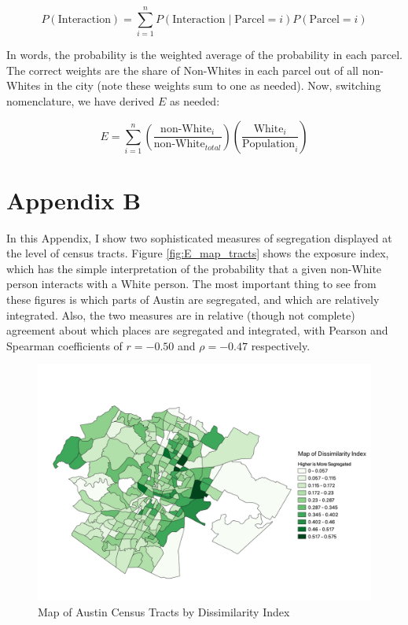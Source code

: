 \documentclass[11pt]{article}
\begin{document}
\begin{equation*}
    P(\text{Interaction})=\sum_{i=1}^n P(\text{Interaction}\mid \text{Parcel}=i)P(\text{Parcel}=i)
\end{equation*}

In words, the probability is the weighted average of the probability in each parcel. The correct weights are the share of Non-Whites in each parcel out of all non-Whites in the city (note these weights sum to one as needed). Now, switching nomenclature, we have derived $E$ as needed:

\begin{equation}
    E=\sum_{i=1}^n\left(\frac{\text{non-White}_i}{\text{non-White}_{total}}\right)\left(\frac{\text{White}_i}{\text{Population}_{i}}\right)
\end{equation}

\pagebreak
\section*{Appendix B} 

\setcounter{table}{0}
\renewcommand{\thetable}{B\arabic{table}}

\setcounter{figure}{0}
\renewcommand{\thefigure}{B\arabic{figure}}

In this Appendix, I show two sophisticated measures of segregation displayed at the level of census tracts. Figure \ref{fig:E_map_tracts} shows the exposure index, which has the simple interpretation of the probability that a given non-White person interacts with a White person. The most important thing to see from these figures is which parts of Austin are segregated, and which are relatively integrated. Also, the two measures are in relative (though not complete) agreement about which places are segregated and integrated, with Pearson and Spearman coefficients of $r=-0.50$ and $\rho=-0.47$ respectively.

\begin{figure}[H]
    \centering
    \includegraphics[width=\textwidth]{D_map_monochrome.pdf}
    \caption{Map of Austin Census Tracts by Dissimilarity Index}
    \label{fig:D_map_tracts}
\end{figure}
\end{document}
